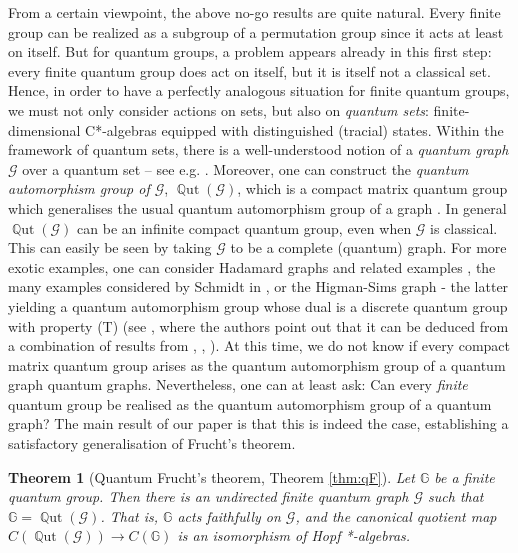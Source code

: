 \documentclass[12pt]{amsart}
\newtheorem{thmx}{Theorem}
\theoremstyle{definition}
\theoremstyle{definition}
\theoremstyle{definition}
\theoremstyle{definition}
\DeclareMathOperator{\Qut}{\mathbb{Q}ut}
\newcommand{\G}{\mathbb{G}}
\newcommand{\Gr}{\mathcal{G}}
\numberwithin{equation}{section}
\begin{document}
From a certain viewpoint, the above no-go results are quite natural. Every finite group can be realized as a subgroup of a permutation group since it acts at least on itself. %
But for quantum groups, a problem appears already in this first step: every finite quantum group does act on itself, but it is itself not a classical set. Hence, in order to have a perfectly analogous situation for finite quantum groups, we must not only consider actions on sets, but also on {\it quantum sets}: finite-dimensional C*-algebras equipped with distinguished (tracial) states.  Within the framework of quantum sets, there is a well-understood notion of a {\it quantum graph} $\Gr$ over a quantum set -- see e.g.  \cite{MRV18, MRV19, Daw24, Was24}.  Moreover, one can construct the {\it quantum automorphism group of $\Gr$}, $\Qut(\Gr)$, which is a compact matrix quantum group which generalises the usual quantum automorphism group of a graph \cite{Daw24,MRV19, BCEHPSW20}.  In general $\Qut(\Gr)$ can be an infinite compact quantum group, even when $\Gr$ is classical.  This can easily be seen by taking $\Gr$ to be a complete (quantum) graph.  For more exotic examples, one can consider Hadamard graphs and related examples \cite{Gr24, Gr23}, the many examples considered by Schmidt in \cite{Sch20a, Sch20b}, or the Higman-Sims graph - the latter yielding a quantum automorphism group whose dual is a discrete quantum group with property (T) (see \cite{RV24}, where the authors point out that it can be deduced from a combination of results from \cite{Kuperberg97}, \cite{Arano18}, \cite{Edge19}).  
At this time, we do not know if every compact matrix quantum group arises as the quantum automorphism group of a quantum graph quantum graphs. 
Nevertheless, one can at least ask: Can every {\it finite} quantum group be realised as the quantum automorphism group of a quantum graph? The main result of our paper is that this is indeed the case, establishing a satisfactory generalisation of Frucht's theorem.

\begin{thmx}[Quantum Frucht's theorem, Theorem \ref{thm:qF}]
\label{T.qFrucht}
Let $\G$ be a finite quantum group.  Then there is an undirected finite quantum graph $\Gr$ such that $\G = \Qut(\Gr)$.  That is, $\G$ acts faithfully on $\Gr$, and the canonical quotient map $C(\Qut(\Gr)) \to C(\G)$ is an isomorphism of Hopf *-algebras.
\end{thmx}
\end{document}
